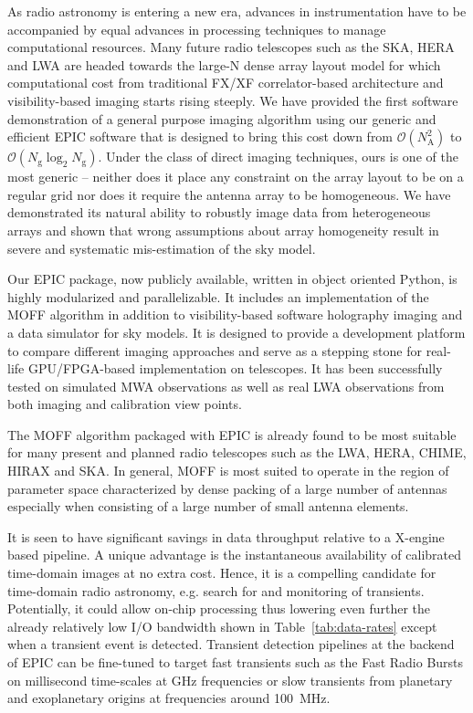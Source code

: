 \documentclass[a4paper,fleqn,usenatbib]{mnras}
\newcommand{\Nant}{N_\textrm{A}}
\newcommand{\Ngrid}{N_\textrm{g}}
\begin{document}
As radio astronomy is entering a new era, advances in instrumentation have to be accompanied by equal advances in processing techniques to manage computational resources. Many future radio telescopes such as the SKA, HERA and LWA are headed towards the large-N dense array layout model for which computational cost from traditional FX/XF correlator-based architecture and visibility-based imaging starts rising steeply. We have provided the first software demonstration of a general purpose imaging algorithm using our generic and efficient EPIC software that is designed to bring this cost down from $\mathcal{O}(\Nant^2)$ to $\mathcal{O}(\Ngrid\log_2 \Ngrid)$. Under the class of direct imaging techniques, ours is one of the most generic -- neither does it place any constraint on the array layout to be on a regular grid nor does it require the antenna array to be homogeneous. We have demonstrated its natural ability to robustly image data from heterogeneous arrays and shown that wrong assumptions about array homogeneity result in severe and systematic mis-estimation of the sky model.

Our EPIC package, now publicly available, written in object oriented Python, is 
highly modularized and parallelizable. It includes an implementation of the 
MOFF algorithm in addition to visibility-based software holography imaging and 
a data simulator for sky models. It is designed to provide a development 
platform to compare different imaging approaches and serve as a stepping stone 
for real-life GPU/FPGA-based implementation on telescopes. It has been 
successfully tested on simulated MWA observations as well as real LWA 
observations from both imaging and calibration view points. 

The MOFF algorithm packaged with EPIC is already found to be most suitable 
for many present and planned radio telescopes such as the LWA, HERA, CHIME,
HIRAX and SKA. In general, MOFF is most suited to operate in the region of 
parameter space characterized by dense packing of a large number of antennas 
especially when consisting of a large number of small antenna elements. 

It is seen to have significant savings in data throughput relative to a 
X-engine based pipeline. A unique advantage is the instantaneous availability 
of calibrated time-domain images at no extra cost. Hence, it is a compelling 
candidate for time-domain radio astronomy, e.g. search for and monitoring of 
transients. Potentially, it could allow on-chip processing thus lowering even 
further the already relatively low I/O bandwidth shown in 
Table~\ref{tab:data-rates} except when a transient event is detected. Transient 
detection pipelines at the backend of EPIC can be fine-tuned to target fast 
transients such as the Fast Radio Bursts \citep[FRB;][]{tho13} on millisecond 
time-scales at GHz frequencies or slow transients from planetary and exoplanetary 
origins at frequencies around 100~MHz. 
\end{document}
